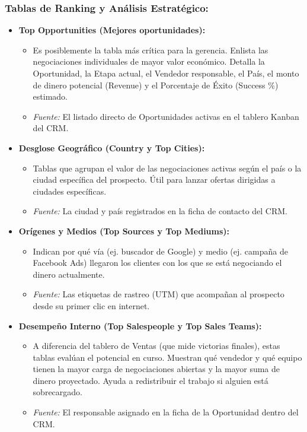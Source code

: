 \subsubsection*{Tablas de Ranking y Análisis Estratégico:}
\begin{itemize}[leftmargin=*]
    \item \textbf{Top Opportunities (Mejores oportunidades):}
    \begin{itemize}
        \item Es posiblemente la tabla más crítica para la gerencia. Enlista las negociaciones individuales de mayor valor económico. Detalla la Oportunidad, la Etapa actual, el Vendedor responsable, el País, el monto de dinero potencial (Revenue) y el Porcentaje de Éxito (Success \%) estimado.
        \item \textit{Fuente:} El listado directo de Oportunidades activas en el tablero Kanban del CRM.
    \end{itemize}
    \item \textbf{Desglose Geográfico (Country y Top Cities):}
    \begin{itemize}
        \item Tablas que agrupan el valor de las negociaciones activas según el país o la ciudad específica del prospecto. Útil para lanzar ofertas dirigidas a ciudades específicas.
        \item \textit{Fuente:} La ciudad y país registrados en la ficha de contacto del CRM.
    \end{itemize}
    \item \textbf{Orígenes y Medios (Top Sources y Top Mediums):}
    \begin{itemize}
        \item Indican por qué vía (ej. buscador de Google) y medio (ej. campaña de Facebook Ads) llegaron los clientes con los que se está negociando el dinero actualmente.
        \item \textit{Fuente:} Las etiquetas de rastreo (UTM) que acompañan al prospecto desde su primer clic en internet.
    \end{itemize}
    \item \textbf{Desempeño Interno (Top Salespeople y Top Sales Teams):}
    \begin{itemize}
        \item A diferencia del tablero de Ventas (que mide victorias finales), estas tablas evalúan el potencial en curso. Muestran qué vendedor y qué equipo tienen la mayor carga de negociaciones abiertas y la mayor suma de dinero proyectado. Ayuda a redistribuir el trabajo si alguien está sobrecargado.
        \item \textit{Fuente:} El responsable asignado en la ficha de la Oportunidad dentro del CRM.
    \end{itemize}
\end{itemize}

